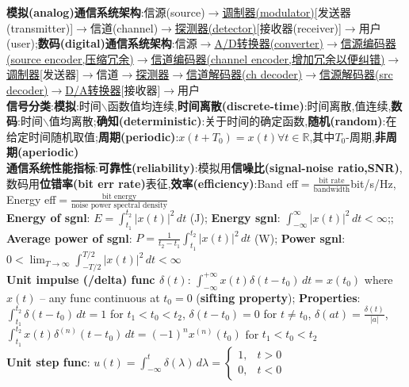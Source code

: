\documentclass[UTF8,a4paper,10pt]{article}
\providecommand{\abs}[1]{\left\lvert#1\right\rvert}
\begin{document}
\scriptsize
\begin{multicols}{2}
    \noindent\textbf{模拟(analog)通信系统架构}:信源(source)$\rightarrow$\uline{调制器(modulator)}[发送器(transmitter)]$\rightarrow$信道(channel)$\rightarrow$\uline{探测器(detector)}[接收器(receiver)]$\rightarrow$用户(user);\textbf{数码(digital)通信系统架构}:信源$\rightarrow$\uline{A/D转换器(converter)$\rightarrow$信源编码器(source encoder,压缩冗余)$\rightarrow$信道编码器(channel encoder,增加冗余以便纠错)$\rightarrow$调制器}[发送器]$\rightarrow$信道$\rightarrow$\uline{探测器$\rightarrow$信道解码器(ch decoder)$\rightarrow$信源解码器(src decoder)$\rightarrow$D/A转换器}[接收器]$\rightarrow$用户\\
    \textbf{信号分类}:\textbf{模拟}:时间$\backslash$函数值均连续,\textbf{时间离散(discrete-time)}:时间离散,值连续,\textbf{数码}:时间$\backslash$值均离散;\textbf{确知(deterministic)}:关于时间的确定函数,\textbf{随机(random)}:在给定时间随机取值;\textbf{周期(periodic)}:$x(t+T_0)=x(t)\forall t\in\mathbb{R}$,其中$T_0$-周期,\textbf{非周期(aperiodic)}\\
    \textbf{通信系统性能指标}:\textbf{可靠性(reliability)}:模拟用\textbf{信噪比(signal-noise ratio,SNR)},数码用\textbf{位错率(bit err rate)}表征,\textbf{效率(efficiency)}:Band eff$=\frac{\text{bit rate}}{\text{bandwidth}}$bit/s/Hz, Energy eff$=\frac{\text{bit energy}}{\text{noise power spectral density}}$\\
    \textbf{Energy of sgnl}: $E=\int_{t_1}^{t_2}\abs{x(t)}^2\,dt$ (J); \textbf{Energy sgnl}: $\int_{-\infty}^{\infty}\abs{x(t)}^2\,dt<\infty$;; \textbf{Average power of sgnl}: $P=\frac{1}{t_2-t_1}\int_{t_1}^{t_2}\abs{x(t)}^2\,dt$ (W); \textbf{Power sgnl}: $0<\lim_{T\rightarrow\infty}\int_{-T/2}^{T/2}\abs{x(t)}^2\,dt<\infty$\\
    \textbf{Unit impulse (/delta) func $\delta(t)$}: $\int_{-\infty}^{+\infty}x(t)\delta(t-t_0)\,dt=x(t_0)$ where $x(t)$ -- any func continuous at $t_0=0$ (\textbf{sifting property}); \textbf{Properties}: $\int_{t_1}^{t_2}\delta(t-t_0)\,dt=1$ for $t_1<t_0<t_2$, $\delta(t-t_0)=0$ for $t\neq t_0$, $\delta(at)=\frac{\delta(t)}{\abs{a}}$, $\int_{t_1}^{t_2}x(t)\delta^{(n)}(t-t_0)\,dt=(-1)^nx^{(n)}(t_0)$ for $t_1<t_0<t_2$\\
    \textbf{Unit step func}: $u(t)=\int_{-\infty}^t\delta(\lambda)\,d\lambda=\left\{\begin{array}{ll}
        1,&t>0\\
        0,&t<0
    \end{array}\right.$\\

\end{multicols}
\end{document}
